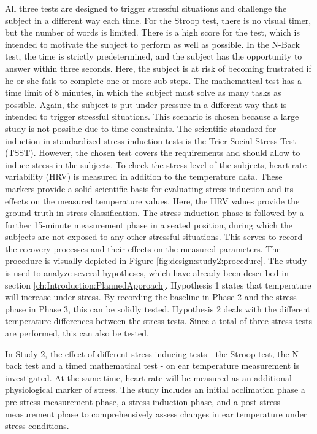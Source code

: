 All three tests are designed to trigger stressful situations and challenge the subject in a different way each time.
For the Stroop test, there is no visual timer, but the number of words is limited. 
There is a high score for the test, which is intended to motivate the subject to perform as well as possible. 
In the N-Back test, the time is strictly predetermined, and the subject has the opportunity to answer within three seconds.
Here, the subject is at risk of becoming frustrated if he or she fails to complete one or more sub-steps.
The mathematical test has a time limit of 8 minutes, in which the subject must solve as many tasks as possible.
Again, the subject is put under pressure in a different way that is intended to trigger stressful situations.
This scenario is chosen because a large study is not possible due to time constraints. 
The scientific standard for induction in standardized stress induction tests is the Trier Social Stress Test (TSST). 
However, the chosen test covers the requirements and should allow to induce stress in the subjects.
To check the stress level of the subjects, heart rate variability (HRV) is measured in addition to the temperature data. 
These markers provide a solid scientific basis for evaluating stress induction and its effects on the measured temperature values.
Here, the HRV values provide the ground truth in stress classification.
The stress induction phase is followed by a further 15-minute measurement phase in a seated position, during which the subjects are not exposed to any other stressful situations. 
This serves to record the recovery processes and their effects on the measured parameters. 
The procedure is visually depicted in Figure \ref{fig:design:study2:procedure}.
The study is used to analyze several hypotheses, which have already been described in section \ref{ch:Introduction:PlannedApproach}.
Hypothesis 1 states that temperature will increase under stress.
By recording the baseline in Phase 2 and the stress phase in Phase 3, this can be solidly tested.
Hypothesis 2 deals with the different temperature differences between the stress tests.
Since a total of three stress tests are performed, this can also be tested.

In Study 2, the effect of different stress-inducing tests - the Stroop test, the N-back test and a timed mathematical test - on ear temperature measurement is investigated.
At the same time, heart rate will be measured as an additional physiological marker of stress. 
The study includes an initial acclimation phase a pre-stress measurement phase, a stress induction phase, and a post-stress measurement phase to comprehensively assess changes in ear temperature under stress conditions.